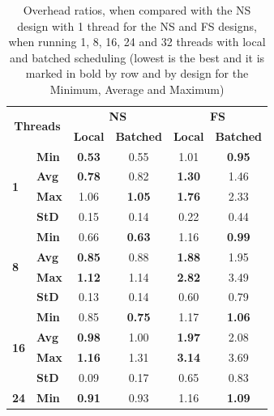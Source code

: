 \documentclass{llncs}
\begin{document}
\setlength{\tabcolsep}{12pt}
\begin{table}[!ht]
\vspace{-\intextsep}
\centering
\caption{Overhead ratios, when compared with the NS design with 1
  thread for the NS and FS designs, when running 1, 8, 16, 24 and 32
  threads with local and batched scheduling (lowest is the best and it
  is marked in bold by row and by design for the Minimum, Average and
  Maximum)}
\vspace{-0.5\intextsep}
\begin{tabular}{ll|cc|cc}
\hline\hline
\multicolumn{2}{c|}{\multirow{2}{*}{\bf Threads}} &
\multicolumn{2}{c|}{\multirow{1}{*}{\bf NS}} &
\multicolumn{2}{|c}{\multirow{1}{*}{\bf FS}}\\ \cline{3-6}
& 
& \multicolumn{1}{c}{\bf Local}
& \multicolumn{1}{c}{\bf Batched}
& \multicolumn{1}{|c}{\bf Local}
& \multicolumn{1}{c}{\bf Batched}\\
\hline
\multirow{4}{*}{\bf 1}
& {\bf Min }& {\bf 0.53}& 0.55& 1.01& {\bf 0.95}\\
& {\bf Avg }& {\bf 0.78}& 0.82& {\bf 1.30}& 1.46\\
& {\bf Max }& 1.06& {\bf 1.05}& {\bf 1.76}& 2.33\\
& {\bf StD }& 0.15& 0.14& 0.22& 0.44\\
\hline
\multirow{4}{*}{\bf 8}
& {\bf Min }& 0.66& {\bf 0.63}& 1.16&{\bf  0.99}\\
& {\bf Avg }& {\bf 0.85}& 0.88& {\bf 1.88}& 1.95\\
& {\bf Max }& {\bf 1.12}& 1.14& {\bf 2.82}& 3.49\\
& {\bf StD }& 0.13& 0.14& 0.60& 0.79\\
\hline
\multirow{4}{*}{\bf 16}
& {\bf Min }& 0.85& {\bf 0.75}& 1.17& {\bf 1.06}\\
& {\bf Avg }& {\bf 0.98}& 1.00& {\bf 1.97}& 2.08\\
& {\bf Max }& {\bf 1.16}& 1.31& {\bf 3.14}& 3.69\\
& {\bf StD }& 0.09& 0.17& 0.65& 0.83\\
\hline
\multirow{4}{*}{\bf 24}
& {\bf Min }& {\bf 0.91}& 0.93& 1.16& {\bf 1.09}\\

\end{tabular}
\end{table}
\end{document}
